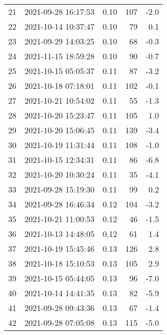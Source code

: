\begin{tabular}{llrrr}
21  & 2021-09-28 16:17:53 &  0.10 &             107 &                   -2.0 \\
22  & 2021-10-14 10:37:47 &  0.10 &              79 &                    0.1 \\
23  & 2021-09-29 14:03:25 &  0.10 &              68 &                   -0.3 \\
24  & 2021-11-15 18:59:28 &  0.10 &              90 &                   -0.7 \\
25  & 2021-10-15 05:05:37 &  0.11 &              87 &                   -3.2 \\
26  & 2021-10-18 07:18:01 &  0.11 &             102 &                   -0.1 \\
27  & 2021-10-21 10:54:02 &  0.11 &              55 &                   -1.3 \\
28  & 2021-10-20 15:23:47 &  0.11 &             105 &                    1.0 \\
29  & 2021-10-20 15:06:45 &  0.11 &             139 &                   -3.4 \\
30  & 2021-10-19 11:31:44 &  0.11 &             108 &                   -1.0 \\
31  & 2021-10-15 12:34:31 &  0.11 &              86 &                   -6.8 \\
32  & 2021-10-20 10:30:24 &  0.11 &              35 &                   -4.1 \\
33  & 2021-09-28 15:19:30 &  0.11 &              99 &                    0.2 \\
34  & 2021-09-28 16:46:34 &  0.12 &             104 &                   -3.2 \\
35  & 2021-10-21 11:00:53 &  0.12 &              46 &                   -1.5 \\
36  & 2021-10-13 14:48:05 &  0.12 &              61 &                    1.4 \\
37  & 2021-10-19 15:45:46 &  0.13 &             126 &                    2.8 \\
38  & 2021-10-18 15:10:53 &  0.13 &             105 &                    2.9 \\
39  & 2021-10-15 05:44:05 &  0.13 &              96 &                   -7.0 \\
40  & 2021-10-14 14:41:35 &  0.13 &              82 &                   -5.9 \\
41  & 2021-09-28 09:43:36 &  0.13 &              67 &                   -1.4 \\
42  & 2021-09-28 07:05:08 &  0.13 &             115 &                   -5.0 \\

\end{tabular}
